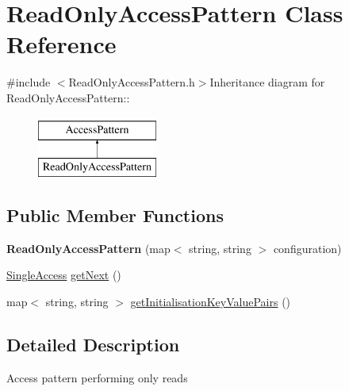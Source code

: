 \hypertarget{classReadOnlyAccessPattern}{
\section{ReadOnlyAccessPattern Class Reference}
\label{classReadOnlyAccessPattern}
}


{\ttfamily \#include $<$ReadOnlyAccessPattern.h$>$}Inheritance diagram for ReadOnlyAccessPattern::\begin{figure}[H]
\begin{center}
\leavevmode
\includegraphics[height=2cm]{classReadOnlyAccessPattern}
\end{center}
\end{figure}
\subsection*{Public Member Functions}
\begin{DoxyCompactItemize}
\item 
\hypertarget{classReadOnlyAccessPattern_ac809863a35ba6cff81d7ae8e1b703bfa}{
{\bfseries ReadOnlyAccessPattern} (map$<$ string, string $>$ configuration)}
\label{classReadOnlyAccessPattern_ac809863a35ba6cff81d7ae8e1b703bfa}

\item 
\hyperlink{structSingleAccess}{SingleAccess} \hyperlink{classReadOnlyAccessPattern_a324b6da6296a17144d51db2841e16ba4}{getNext} ()
\item 
map$<$ string, string $>$ \hyperlink{classReadOnlyAccessPattern_a2e6ce8d90050b038ffbf643b344e0eb5}{getInitialisationKeyValuePairs} ()
\end{DoxyCompactItemize}


\subsection{Detailed Description}
Access pattern performing only reads 

